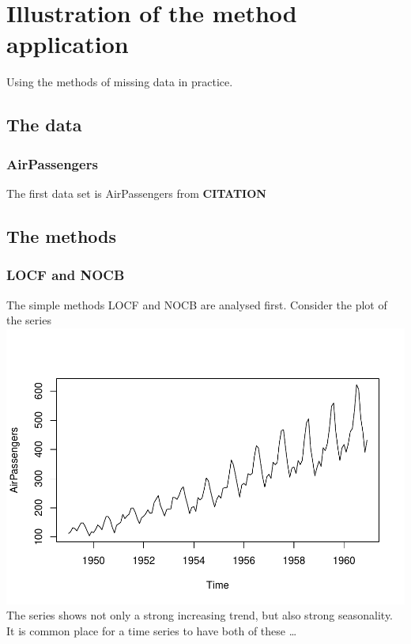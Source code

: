 \documentclass[
]{report}
\begin{document}
\chapter{Illustration of the method
application}\label{illustration-of-the-method-application}

Using the methods of missing data in practice.

\section{The data}\label{the-data}

\subsection{AirPassengers}\label{airpassengers}

The first data set is AirPassengers from \textbf{CITATION}

\section{The methods}\label{the-methods}

\subsection{LOCF and NOCB}\label{locf-and-nocb}

The simple methods LOCF and NOCB are analysed first. Consider the plot
of the series
\includegraphics{ProjectReport_files/figure-latex/unnamed-chunk-13-1.pdf}
The series shows not only a strong increasing trend, but also strong
seasonality. It is common place for a time series to have both of these
\ldots{}
\end{document}
